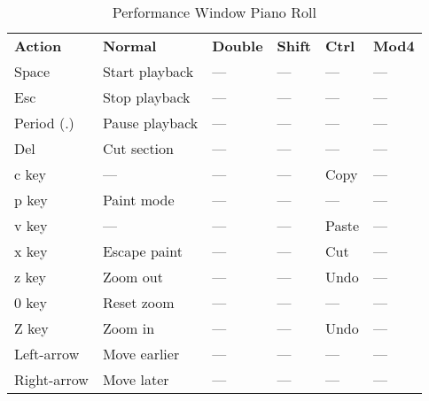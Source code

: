    \begin{table}[H]
      \centering
      \caption{Performance Window Piano Roll}
      \label{table:perf_window_piano_roll}
      \begin{tabular}{l l l l l l}
         \textbf{Action}   & \textbf{Normal} & \textbf{Double}    & \textbf{Shift}     & \textbf{Ctrl}   & \textbf{Mod4}      \\
         Space             & Start playback  & ---                & ---                & ---             & ---                \\
         Esc               & Stop playback   & ---                & ---                & ---             & ---                \\
         Period (.)        & Pause playback  & ---                & ---                & ---             & ---                \\
         Del               & Cut section     & ---                & ---                & ---             & ---                \\
         c key             & ---             & ---                & ---                & Copy            & ---                \\
         p key             & Paint mode      & ---                & ---                & ---             & ---                \\
         v key             & ---             & ---                & ---                & Paste           & ---                \\
         x key             & Escape paint    & ---                & ---                & Cut             & ---                \\
         z key             & Zoom out        & ---                & ---                & Undo            & ---                \\
         0 key             & Reset zoom      & ---                & ---                & ---             & ---                \\
         Z key             & Zoom in         & ---                & ---                & Undo            & ---                \\
         Left-arrow        & Move earlier    & ---                & ---                & ---             & ---                \\
         Right-arrow       & Move later      & ---                & ---                & ---             & ---                \\

\end{tabular}
\end{table}
